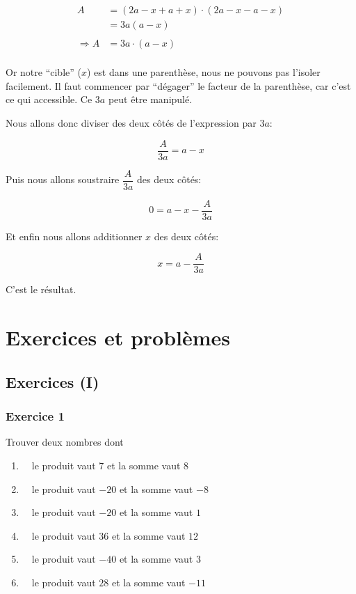 \documentclass[
  12pt,
]{book}
\providecommand{\tightlist}{%
  \setlength{\itemsep}{0pt}\setlength{\parskip}{0pt}}
\begin{document}
\begin{align*}
 A & =(2a-x+a+x)\cdot(2a-x-a-x)\\
   & = 3a(a-x)\\
   \\
   \Longrightarrow A &= 3a\cdot(a-x)\\
\end{align*}

Or notre ``cible'' (\(x\)) est dans une parenthèse, nous ne pouvons pas l'isoler facilement. Il faut commencer par ``dégager'' le facteur de la parenthèse, car c'est ce qui accessible. Ce \(3a\) peut être manipulé.

Nous allons donc diviser des deux côtés de l'expression par \(3a\):

\[\dfrac{A}{3a}=a-x\]

Puis nous allons soustraire \(\dfrac{A}{3a}\) des deux côtés:

\[0=a-x-\dfrac{A}{3a}\]

Et enfin nous allons additionner \(x\) des deux côtés:

\[x=a-\dfrac{A}{3a}\]

C'est le résultat.

\hypertarget{exercices-et-probluxe8mes-2}{%
\section{Exercices et problèmes}\label{exercices-et-probluxe8mes-2}}

\hypertarget{exercices-i-2}{%
\subsection{Exercices (I)}\label{exercices-i-2}}

\hypertarget{exercice-1-4}{%
\subsubsection*{Exercice 1}\label{exercice-1-4}}

Trouver deux nombres dont

\begin{enumerate}
\def\labelenumi{\arabic{enumi}.}
\tightlist
\item
  \(\quad\)le produit vaut \(7\) et la somme vaut \(8\)
\item
  \(\quad\)le produit vaut \(-20\) et la somme vaut \(-8\)
\item
  \(\quad\)le produit vaut \(-20\) et la somme vaut \(1\)
\item
  \(\quad\)le produit vaut \(36\) et la somme vaut \(12\)
\item
  \(\quad\)le produit vaut \(-40\) et la somme vaut \(3\)
\item
  \(\quad\)le produit vaut \(28\) et la somme vaut \(-11\)
\end{enumerate}
\end{document}
